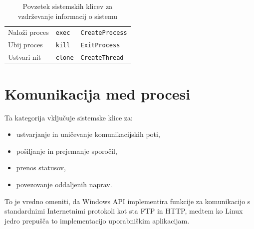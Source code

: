 \documentclass[a4paper,12pt,openright]{book}
\begin{document}
\begin{table}[h!]
\begin{center}
\begin{tabular}{ p{3cm}|p{2.9cm}|p{6.3cm} }
			Naloži proces                    & \verb|exec|                                     & \verb|CreateProcess|                                                                                               \\
			Ubij proces                       & \verb|kill|                                     & \verb|ExitProcess|                                                                                                 \\
			Ustvari nit                       & \verb|clone|                                    & \verb|CreateThread|                                                                                                \\
		\end{tabular}
	\end{center}
	\label{tab:information_maintenance}
	\caption{Povzetek sistemskih klicev za vzdrževanje informacij o sistemu}
\end{table} 

\section{Komunikacija med procesi}

Ta kategorija vključuje sistemske klice za:
\begin{itemize}
	\item ustvarjanje in uničevanje komunikacijskih poti,
	\item pošiljanje in prejemanje sporočil,
	\item prenos statusov,
	\item povezovanje oddaljenih naprav. \cite{Silberschatz_Galvin_Gagne_2018}
\end{itemize}

To je vredno omeniti, da Windows API implementira funkcije za komunikacijo s standardnimi Internetnimi protokoli kot sta FTP in HTTP, medtem ko Linux jedro prepušča to implementacijo uporabniškim aplikacijam.
\end{document}

